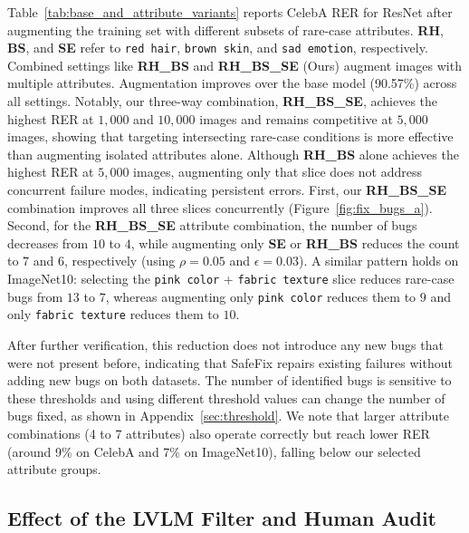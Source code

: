 \documentclass[10pt]{article} %
\begin{document}
Table~\ref{tab:base_and_attribute_variants} reports CelebA RER for ResNet after augmenting the training set with different subsets of rare-case attributes. \textbf{RH}, \textbf{BS}, and \textbf{SE} refer to \texttt{red hair}, \texttt{brown skin}, and \texttt{sad emotion}, respectively. Combined settings like \textbf{RH\_BS} and \textbf{RH\_BS\_SE} (Ours) augment images with multiple attributes. Augmentation improves over the base model (90.57\%) across all settings. Notably, our three-way combination, \textbf{RH\_BS\_SE}, achieves the highest RER at $1,000$ and $10,000$ images and remains competitive at $5,000$ images, showing that targeting intersecting rare-case conditions is more effective than augmenting isolated attributes alone. Although \textbf{RH\_BS} alone achieves the highest RER at $5,000$ images, augmenting only that slice does not address concurrent failure modes, indicating persistent errors. First, our \textbf{RH\_BS\_SE} combination improves all three slices concurrently (Figure~\ref{fig:fix_bugs_a}). Second, for the \textbf{RH\_BS\_SE} attribute combination, the number of bugs decreases from $10$ to $4$, while augmenting only \textbf{SE} or \textbf{RH\_BS} reduces the count to $7$ and $6$, respectively (using $\rho=0.05$ and $\epsilon=0.03$). A similar pattern holds on ImageNet10: selecting the \texttt{pink color} + \texttt{fabric texture} slice reduces rare-case bugs from $13$ to $7$, whereas augmenting only \texttt{pink color} reduces them to $9$ and only \texttt{fabric texture} reduces them to $10$.

After further verification, this reduction does not introduce any new bugs that were not present before, indicating that SafeFix repairs existing failures without adding new bugs on both datasets. The number of identified bugs is sensitive to these thresholds and using different threshold values can change the number of bugs fixed, as shown in Appendix~\ref{sec:threshold}. We note that larger attribute combinations (4 to 7 attributes) also operate correctly but reach lower RER (around 9\% on CelebA and 7\% on ImageNet10), falling below our selected attribute groups.


\vspace{10pt}
\subsection{Effect of the LVLM Filter and Human Audit}
\label{sec:human_audit}
\end{document}
